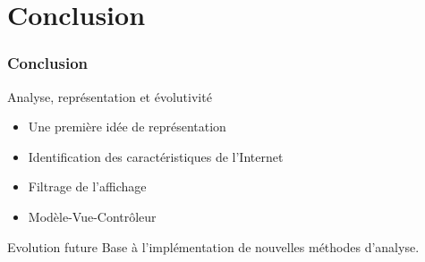\section*{Conclusion}

\frame
{
\frametitle{Conclusion}

\begin{block}{Analyse, représentation et évolutivité}
 \begin{itemize}
 \item Une première idée de représentation
 \item Identification des caractéristiques de l'Internet
 \item Filtrage de l'affichage
 \item Modèle-Vue-Contrôleur
 \end{itemize}

\end{block}

\begin{block}{Evolution future}
  Base à l'implémentation de nouvelles méthodes d'analyse.
\end{block}

 

}